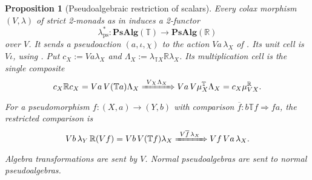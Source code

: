 \documentclass[11pt]{article}
\theoremstyle{plain}
\newtheorem{proposition}[theorem]{Proposition}
\theoremstyle{definition}
\theoremstyle{remark}
\newcommand{\PsAlg}{\mathbf{PsAlg}}
\numberwithin{equation}{section}
\begin{document}
\begin{proposition}[Pseudoalgebraic restriction of scalars]
\label{prop:pseudo-restriction-scalars}
Every colax morphism $(V,\lambda)$ of strict 2-monads as in
 induces a 2-functor
\begin{equation}
  \lambda^*_{\mathrm{ps}}\colon
  \PsAlg(\mathbb T)\longrightarrow\PsAlg(\mathbb R)
  \label{eq:pseudo-restriction-functor}
\end{equation}
over $V$.  It sends a pseudoaction
$(a,\iota,\chi)$ to the action $Va\,\lambda_X$ of
.  Its unit cell is $V\iota$, using
.  Put
$c_X:=Va\lambda_X$ and
$\Lambda_X:=\lambda_{\mathbb T X}\mathbb R\lambda_X$.  Its
multiplication cell is the single composite
\begin{equation}
c_X\mathbb Rc_X
=Va\,V(\mathbb Ta)\Lambda_X
\xRightarrow{\ V\chi\,\Lambda_X\ }
Va\,V\mu^{\mathbb T}_X\Lambda_X
=c_X\mu^{\mathbb R}_{VX}.
 \label{eq:restricted-pseudo-multiplication}
\end{equation}
For a pseudomorphism
$f\colon(X,a)\to(Y,b)$ with comparison
$\overline f\colon b\mathbb T f\Rightarrow fa$, the restricted
comparison is
\begin{equation}
Vb\,\lambda_Y\,\mathbb R(Vf)
=Vb\,V(\mathbb T f)\lambda_X
\xRightarrow{\ V\overline f\,\lambda_X\ }
Vf\,Va\,\lambda_X.
\label{eq:restricted-pseudomorphism}
\end{equation}
Algebra transformations are sent by $V$.  Normal pseudoalgebras are
sent to normal pseudoalgebras.
\end{proposition}
\end{document}

